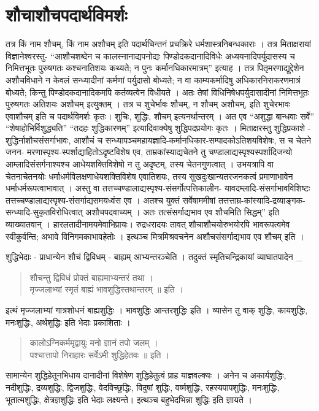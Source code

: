 \section*{शौचाशौचपदार्थविमर्शः}

तत्र किं नाम शौचम्, किं नाम अशौचम् इति पदार्थचिन्तनं प्रचक्रिरे धर्मशास्त्रनिबन्धकाराः । तत्र मिताक्षरायां विज्ञानेश्वरस्तु- “आशौचशब्देन च कालस्नानाद्यपनोद्यः पिण्डोदकदानादिविधेः अध्ययनादिपर्युदासस्य च निमित्तभूतः पुरुषगतः कश्चनातिशयः कथ्यते; न पुनः कर्मानधिकारमात्रम्” इत्याह । तत्र पितृमरणाद्युद्देशेन अशौचविधाने न केवलं सन्ध्यादीनां कर्मणां पर्युदासो बोध्यते; न वा काम्यकर्मादिषु अधिकारनिराकरणमात्रं बोध्यते; किन्तु पिण्डोदकदानादिकमपि कर्तव्यत्वेन विधीयते । अतः तेषां विधिनिषेधपर्युदासादीनां निमित्तभूतः पुरुषगतः अतिशयः अशौचम् इत्युक्तम् । तत्र च शुचेर्भावः शौचम्, न शौचम् अशौचम्, इति शुचेरभावः एवाशौचम् इति च पदार्थविमर्शः कृतः। शुचिः, शुद्धिः, शौचम् इत्यनर्थान्तरम् । अत एव “अशुद्धा बान्धवाः सर्वे” “शेषाहोभिर्विशुद्ध्यति” “तदहः शुद्धिकारणम्” इत्यादिवाक्येषु शुद्धिपदप्रयोगः कृतः । मिताक्षरस्तु शुद्धिप्रकाशे - शुद्धिर्नाशौचसंसर्गाभावः, आशौचं च सन्ध्यापञ्चमहायज्ञादि-कर्मानधिकार-सम्पादकोऽतिशयविशेषः, स च चेतने जनन- मरणास्पृश्य-स्पर्शाद्याहितोऽदृष्टविशेष एव, ताम्रकांस्याद्यचेतने तु चण्डालाद्यस्पृश्यस्पर्शादिजन्यो आम्लादिसंसर्गनाश्यश्च आधेयशक्तिविशेषो न तु अदृष्टम्, तस्य चेतनगुणत्वात् । उभयत्रापि वा चेतनाचेतनयोः धर्माधर्मविलक्षणाधेयशक्तिविशेष एवातिशयः, तस्य सुखदुःखान्यतरजनकत्वं प्रमाणाभावेन धर्माधर्मरूपत्वाभावात् । अस्तु वा तत्तच्चण्डालाद्यस्पृश्य-संसर्गोत्पत्तिकालीन- यावदम्लादि-संसर्गाभावविशिष्टः तत्तच्चण्डालाद्यस्पृश्य-संसर्गाद्यसमयध्वंस एव । अतश्च युक्तं सर्वेषाममीषां तत्तत्ताम्र-कांस्यादि-द्रव्याङ्गक-सन्ध्यादि-सुकृतविरोधित्वात् अशौचपदवाच्यम् । अतः तत्संसर्गाद्यभाव एव शौचमिति सिद्धम्” इति व्याख्यातवान् । हारलतादीनामयमेवाभिप्रायः। रुद्रधरादयः तावत् शौचाशौचयोरुभयोरपि भावरूपत्वमेव स्वीकुर्वन्ति; अभावे विनिगमकाभावहेतोः ।  इत्थञ्च मित्रमिश्रवचनेन अशौचसंसर्गाद्यभाव एव शौचम् इति ।

शुद्धिभेदाः - प्राधान्येन शौचं द्विविधम् - बाह्यम् आभ्यन्तरञ्चेति । तदुक्तं स्मृतिचन्द्रिकायां व्याघातपादेन _ 
\begin{verse}
शौचन्तु द्विविधं प्रोक्तं बाह्यमाभ्यन्तरं तथा ।\\
मृज्जलाभ्यां स्मृतं बाह्यं भावशुद्धिस्तथान्तरम् ॥ इति । 
\end{verse}
इत्थं मृज्जलाभ्यां गात्रशोधनं बाह्यशुद्धिः । भावशुद्धिः आन्तरशुद्धिः इति । व्यासेन तु वाक् शुद्धिः, कायशुद्धिः, मनःशुद्धिः, अर्थशुद्धिः इति भेदाः प्रकाशिताः । 
\begin{verse}
कालोऽग्निकर्ममृद्वायुः मनो ज्ञानं तपो जलम् । \\
पश्चात्तापो निराहारः सर्वेऽमी शुद्धिहेतवः ॥ इति ।
\end{verse}
सामान्येन शुद्धिहेतूनभिधाय दानादीनां विशेषेण शुद्धिहेतुत्वं प्राह याज्ञवल्क्यः । अनेन च अकार्यशुद्धिः, नदीशुद्धिः, द्रव्यशुद्धिः, द्विजशुद्धिः, वेदविच्छुद्धिः, विदुषां शुद्धिः, वर्ष्मशुद्धिः, रहस्यपापशुद्धिः, मनःशुद्धिः, भूतात्मशुद्धिः, क्षेत्रज्ञशुद्धिः इति भेदाः लक्ष्यन्ते।  इत्थञ्च बहुभेदभिन्ना शुद्धिः इति ज्ञायते । 

